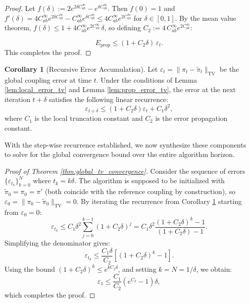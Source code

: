 \documentclass[11pt]{article}
\theoremstyle{definition}
\newtheorem{corollary}[theorem]{Corollary}
\numberwithin{equation}{section}%
\begin{document}
{\begin{proof}
Let $f(\delta) := 2e^{2\delta C_{ab}^\infty} - e^{\delta C_{ab}^\infty}$. Then $f(0)=1$ and
$f'(\delta) = 4C_{ab}^\infty e^{2\delta C_{ab}^\infty} - C_{ab}^\infty e^{\delta C_{ab}^\infty} \le 4C_{ab}^\infty e^{2C_{ab}^\infty}$
for $\delta\in[0,1]$. By the mean value theorem, $f(\delta) \le 1 + 4C_{ab}^\infty e^{2C_{ab}^\infty}\,\delta$, so defining $C_2 := 4\,C_{ab}^\infty e^{2C_{ab}^\infty}$:

\begin{equation}
E_{\mathrm{prop}} \le (1 + C_2 \delta)\,\varepsilon_t.
\end{equation}
This completes the proof.
\end{proof}


\begin{corollary}[Recursive Error Accumulation]
\label{cor:error_recursion}
Let $\varepsilon_t = \|\pi_t - \tilde{\pi}_t\|_{\mathrm{TV}}$ be the global coupling error at time $t$. Under the conditions of Lemma \ref{lem:local_error_tv} and Lemma \ref{lem:prop_error_tv}, the error at the next iteration $t+\delta$ satisfies the following linear recurrence:
\begin{equation}
\label{eq:tv_recursion_final}
\varepsilon_{t+\delta} \le (1 + C_2 \delta) \varepsilon_t + C_1 \delta^2,
\end{equation}
where $C_1$ is the local truncation constant and $C_2$ is the error propagation constant.
\end{corollary}

With the step-wise recurrence established, we now synthesize these components to solve for the global convergence bound over the entire algorithm horizon.

\begin{proof}[Proof of Theorem \ref{thm:global_tv_convergence}]
Consider the sequence of errors $\{\varepsilon_{t_k}\}_{k=0}^N$ where $t_k = k\delta$. The algorithm is supposed to be initialized with $\tilde{\pi}_0 = \pi_0 = \pi'$ (both coincide with the reference coupling by construction), so $\varepsilon_0 = \|\pi_0 - \tilde{\pi}_0\|_{\mathrm{TV}} = 0$. By iterating the recurrence from Corollary \ref{cor:error_recursion} starting from $\varepsilon_0 = 0$:
\begin{equation*}
\varepsilon_{t_k} \le C_1 \delta^2 \sum_{j=0}^{k-1} (1 + C_2 \delta)^j = C_1 \delta^2 \frac{(1 + C_2 \delta)^k - 1}{(1 + C_2 \delta) - 1}.
\end{equation*}
Simplifying the denominator gives:
\begin{equation*}
\varepsilon_{t_k} \le \frac{C_1 \delta}{C_2} \left[ (1 + C_2 \delta)^k - 1 \right].
\end{equation*}
Using the bound $(1 + C_2 \delta)^k \le e^{k C_2 \delta}$, and setting $k=N=1/\delta$, we obtain:
\begin{equation*}
\varepsilon_1 \le \frac{C_1}{C_2} (e^{C_2} - 1) \delta,
\end{equation*}
which completes the proof.
\end{proof}

}
\end{document}
